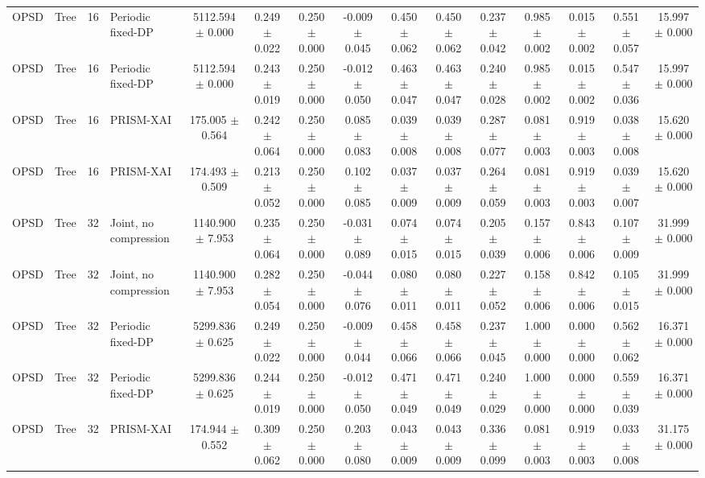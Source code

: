 \begin{tabular}{llllccccccccccc}
OPSD & Tree & 16 & Periodic fixed-DP & 5112.594 $\pm$ 0.000 & 0.249 $\pm$ 0.022 & 0.250 $\pm$ 0.000 & -0.009 $\pm$ 0.045 & 0.450 $\pm$ 0.062 & 0.450 $\pm$ 0.062 & 0.237 $\pm$ 0.042 & 0.985 $\pm$ 0.002 & 0.015 $\pm$ 0.002 & 0.551 $\pm$ 0.057 & 15.997 $\pm$ 0.000 \\
OPSD & Tree & 16 & Periodic fixed-DP & 5112.594 $\pm$ 0.000 & 0.243 $\pm$ 0.019 & 0.250 $\pm$ 0.000 & -0.012 $\pm$ 0.050 & 0.463 $\pm$ 0.047 & 0.463 $\pm$ 0.047 & 0.240 $\pm$ 0.028 & 0.985 $\pm$ 0.002 & 0.015 $\pm$ 0.002 & 0.547 $\pm$ 0.036 & 15.997 $\pm$ 0.000 \\
OPSD & Tree & 16 & PRISM-XAI & 175.005 $\pm$ 0.564 & 0.242 $\pm$ 0.064 & 0.250 $\pm$ 0.000 & 0.085 $\pm$ 0.083 & 0.039 $\pm$ 0.008 & 0.039 $\pm$ 0.008 & 0.287 $\pm$ 0.077 & 0.081 $\pm$ 0.003 & 0.919 $\pm$ 0.003 & 0.038 $\pm$ 0.008 & 15.620 $\pm$ 0.000 \\
OPSD & Tree & 16 & PRISM-XAI & 174.493 $\pm$ 0.509 & 0.213 $\pm$ 0.052 & 0.250 $\pm$ 0.000 & 0.102 $\pm$ 0.085 & 0.037 $\pm$ 0.009 & 0.037 $\pm$ 0.009 & 0.264 $\pm$ 0.059 & 0.081 $\pm$ 0.003 & 0.919 $\pm$ 0.003 & 0.039 $\pm$ 0.007 & 15.620 $\pm$ 0.000 \\
OPSD & Tree & 32 & Joint, no compression & 1140.900 $\pm$ 7.953 & 0.235 $\pm$ 0.064 & 0.250 $\pm$ 0.000 & -0.031 $\pm$ 0.089 & 0.074 $\pm$ 0.015 & 0.074 $\pm$ 0.015 & 0.205 $\pm$ 0.039 & 0.157 $\pm$ 0.006 & 0.843 $\pm$ 0.006 & 0.107 $\pm$ 0.009 & 31.999 $\pm$ 0.000 \\
OPSD & Tree & 32 & Joint, no compression & 1140.900 $\pm$ 7.953 & 0.282 $\pm$ 0.054 & 0.250 $\pm$ 0.000 & -0.044 $\pm$ 0.076 & 0.080 $\pm$ 0.011 & 0.080 $\pm$ 0.011 & 0.227 $\pm$ 0.052 & 0.158 $\pm$ 0.006 & 0.842 $\pm$ 0.006 & 0.105 $\pm$ 0.015 & 31.999 $\pm$ 0.000 \\
OPSD & Tree & 32 & Periodic fixed-DP & 5299.836 $\pm$ 0.625 & 0.249 $\pm$ 0.022 & 0.250 $\pm$ 0.000 & -0.009 $\pm$ 0.044 & 0.458 $\pm$ 0.066 & 0.458 $\pm$ 0.066 & 0.237 $\pm$ 0.045 & 1.000 $\pm$ 0.000 & 0.000 $\pm$ 0.000 & 0.562 $\pm$ 0.062 & 16.371 $\pm$ 0.000 \\
OPSD & Tree & 32 & Periodic fixed-DP & 5299.836 $\pm$ 0.625 & 0.244 $\pm$ 0.019 & 0.250 $\pm$ 0.000 & -0.012 $\pm$ 0.050 & 0.471 $\pm$ 0.049 & 0.471 $\pm$ 0.049 & 0.240 $\pm$ 0.029 & 1.000 $\pm$ 0.000 & 0.000 $\pm$ 0.000 & 0.559 $\pm$ 0.039 & 16.371 $\pm$ 0.000 \\
OPSD & Tree & 32 & PRISM-XAI & 174.944 $\pm$ 0.552 & 0.309 $\pm$ 0.062 & 0.250 $\pm$ 0.000 & 0.203 $\pm$ 0.080 & 0.043 $\pm$ 0.009 & 0.043 $\pm$ 0.009 & 0.336 $\pm$ 0.099 & 0.081 $\pm$ 0.003 & 0.919 $\pm$ 0.003 & 0.033 $\pm$ 0.008 & 31.175 $\pm$ 0.000 \\

\end{tabular}
